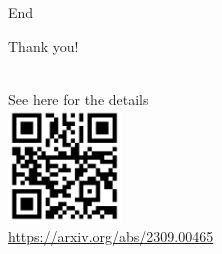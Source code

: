 \documentclass[9pt]{beamer}
\theoremstyle{definition}
\begin{document}

\begin{frame}[fragile]{End}
  \begin{center}
    Thank you!
  \end{center}
  \begin{center}
    \\
    See here for the details \\

    \includegraphics[height=3cm, width=3cm]{images/paper-qr}\\
    \url{https://arxiv.org/abs/2309.00465}

  \end{center}

\end{frame}

\end{document}
